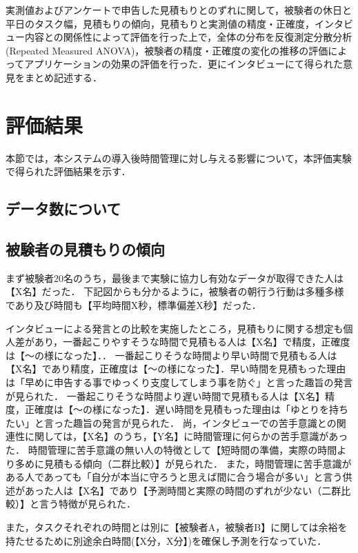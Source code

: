 実測値およびアンケートで申告した見積もりとのずれに関して，被験者の休日と平日のタスク幅，見積もりの傾向，見積もりと実測値の精度・正確度，インタビュー内容との関係性によって評価を行った上で，全体の分布を反復測定分散分析(Repeated Measured ANOVA)，被験者の精度・正確度の変化の推移の評価によってアプリケーションの効果の評価を行った．更にインタビューにて得られた意見をまとめ記述する．

\section{評価結果}
本節では，本システムの導入後時間管理に対し与える影響について，本評価実験で得られた評価結果を示す．
\subsection{データ数について}
\subsection{被験者の見積もりの傾向}
まず被験者20名のうち，最後まで実験に協力し有効なデータが取得できた人は【X名】だった．
下記図\label{fig:result1}からも分かるように，被験者の朝行う行動は多種多様であり及び時間も【平均時間X秒，標準偏差X秒】だった．

インタビューによる発言との比較を実施したところ，見積もりに関する想定も個人差があり，一番起こりやすそうな時間で見積もる人は【X名】で精度，正確度は【〜の様になった】．．
一番起こりそうな時間より早い時間で見積もる人は【X名】であり精度，正確度は【〜の様になった】．早い時間を見積もった理由は「早めに申告する事でゆっくり支度してしまう事を防ぐ」と言った趣旨の発言が見られた．
一番起こりそうな時間より遅い時間で見積もる人は【X名】精度，正確度は【〜の様になった】．遅い時間を見積もった理由は「ゆとりを持ちたい」と言った趣旨の発言が見られた．
尚，インタビューでの苦手意識との関連性に関しては，【X名】のうち，【Y名】に時間管理に何らかの苦手意識があった．
時間管理に苦手意識の無い人の特徴として【短時間の準備，実際の時間より多めに見積もる傾向（二群比較）】が見られた．
また，時間管理に苦手意識がある人であっても「自分が本当に守ろうと思えば間に合う場合が多い」と言う供述があった人は【X名】であり【予測時間と実際の時間のずれが少ない（二群比較）】と言う特徴が見られた．

また，タスクそれぞれの時間とは別に【被験者A，被験者B】に関しては余裕を持たせるために別途余白時間(【X分，X分】)を確保し予測を行なっていた．

